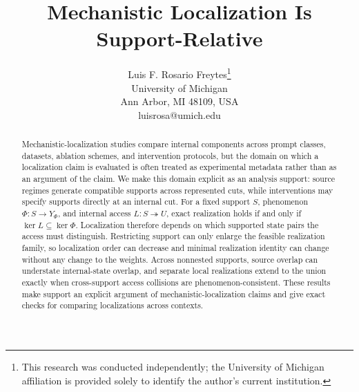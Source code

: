 \documentclass[10pt]{article}
\title{Mechanistic Localization Is Support-Relative}
\author{
\name Luis F. Rosario Freytes\thanks{This research was conducted independently; the University of Michigan affiliation is provided solely to identify the author's current institution.}\\
\addr University of Michigan\\
\addr Ann Arbor, MI 48109, USA\\
\email luisrosa@umich.edu
}
\newcommand{\Ker}{\operatorname{ker}}
\begin{document}
\maketitle

\begin{abstract}
Mechanistic-localization studies compare internal components across prompt classes, datasets, ablation schemes, and intervention protocols, but the domain on which a localization claim is evaluated is often treated as experimental metadata rather than as an argument of the claim. We make this domain explicit as an analysis support: source regimes generate compatible supports across represented cuts, while interventions may specify supports directly at an internal cut. For a fixed support $S$, phenomenon $\Phi:S\to Y_\Phi$, and internal access $L:S\twoheadrightarrow U$, exact realization holds if and only if $\Ker L\subseteq\Ker\Phi$. Localization therefore depends on which supported state pairs the access must distinguish. Restricting support can only enlarge the feasible realization family, so localization order can decrease and minimal realization identity can change without any change to the weights. Across nonnested supports, source overlap can understate internal-state overlap, and separate local realizations extend to the union exactly when cross-support access collisions are phenomenon-consistent. These results make support an explicit argument of mechanistic-localization claims and give exact checks for comparing localizations across contexts.\footnotemark
\end{abstract}














\end{document}
